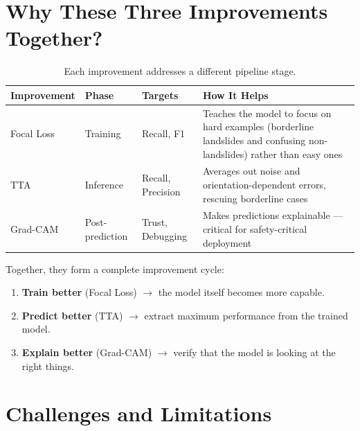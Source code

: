 \documentclass[11pt]{article}
\begin{document}
\section{Why These Three Improvements Together?}

\begin{table}[H]
\centering
\renewcommand{\arraystretch}{1.3}
\begin{tabularx}{\textwidth}{lllX}
\toprule
\textbf{Improvement} & \textbf{Phase} & \textbf{Targets} & \textbf{How It Helps} \\
\midrule
Focal Loss & Training & Recall, F1 & Teaches the model to focus on hard examples (borderline landslides and confusing non-landslides) rather than easy ones \\
TTA & Inference & Recall, Precision & Averages out noise and orientation-dependent errors, rescuing borderline cases \\
Grad-CAM & Post-prediction & Trust, Debugging & Makes predictions explainable --- critical for safety-critical deployment \\
\bottomrule
\end{tabularx}
\caption{Each improvement addresses a different pipeline stage.}
\end{table}

\noindent Together, they form a complete improvement cycle:
\begin{enumerate}[noitemsep]
    \item \textbf{Train better} (Focal Loss) $\to$ the model itself becomes more capable.
    \item \textbf{Predict better} (TTA) $\to$ extract maximum performance from the trained model.
    \item \textbf{Explain better} (Grad-CAM) $\to$ verify that the model is looking at the right things.
\end{enumerate}

\section{Challenges and Limitations}
\end{document}
